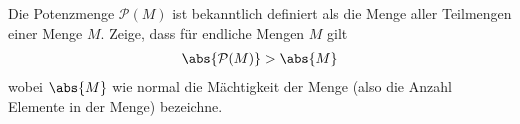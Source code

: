 \begin{exercise}
  Die Potenzmenge $\mathcal{P}(M)$ ist bekanntlich definiert als die Menge aller
  Teilmengen einer Menge $M$. Zeige, dass für endliche Mengen $M$ gilt
  \begin{equation*}
    \begin{split}
      \abs{ \mathcal{P}(M) } > \abs{ M }
    \end{split}
  \end{equation*}
  wobei $\abs{ M }$ wie normal die Mächtigkeit der Menge (also die Anzahl
  Elemente in der Menge) bezeichne.
\end{exercise}
